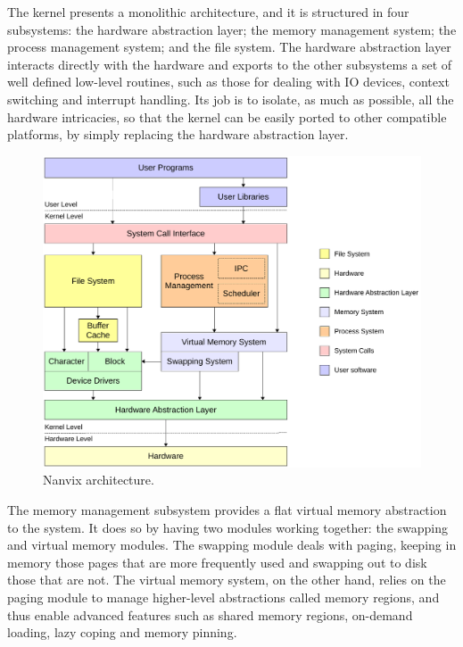 		The kernel presents a monolithic architecture, and it is
		structured in four subsystems: the hardware abstraction layer;
		the memory management system; the process management system; and
		the file system. The hardware abstraction layer interacts
		directly with the hardware and exports to the other subsystems a
		set of well defined low-level routines, such as those for
		dealing with IO devices, context switching and interrupt
		handling. Its job is to isolate, as much as possible, all the
		hardware intricacies, so that the kernel can be easily ported to
		other compatible platforms, by simply replacing the hardware
		abstraction layer.

		\begin{figure}[t] \centering
		\includegraphics[scale=0.61]{img/nanvix-architecture}
		\caption{Nanvix architecture.} \label{figure: nanvix
		architecture} \end{figure}

		The memory management subsystem provides a flat virtual memory
		abstraction to the system. It does so by having two modules
		working together: the swapping and virtual memory modules. The
		swapping module deals with paging, keeping in memory those pages
		that are more frequently used and swapping out to disk those
		that are not.  The virtual memory system, on the other hand,
		relies on the paging module to manage higher-level abstractions
		called memory regions, and thus enable advanced features such as
		shared memory regions, on-demand loading, lazy coping and memory
		pinning.


